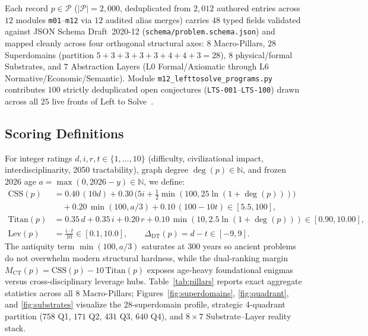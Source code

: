 \documentclass[11pt,reqno]{amsart}
\theoremstyle{plain}
\theoremstyle{definition}
\newcommand{\code}[1]{{\footnotesize\nolinkurl{#1}}}
\begin{document}
Each record $p \in \mathcal{P}$ ($|\mathcal{P}| = 2{,}000$, deduplicated from $2{,}012$ authored entries across $12$ modules \code{m01}--\code{m12} via $12$ audited alias merges) carries $48$ typed fields validated against JSON Schema Draft~2020-12 (\code{schema/problem.schema.json}) and mapped cleanly across four orthogonal structural axes: $8$ Macro-Pillars, $28$ Superdomains (partition $5+3+3+3+3+4+4+3=28$), $8$ physical/formal Substrates, and $7$ Abstraction Layers ($\text{L0}$ Formal/Axiomatic through $\text{L6}$ Normative/Economic/Semantic). Module \code{m12_lefttosolve_programs.py} contributes $100$ strictly deduplicated open conjectures (\code{LTS-001}--\code{LTS-100}) drawn across all $25$ live fronts of Left to Solve~\cite{lefttosolve2026}.

\subsection{Scoring Definitions}
For integer ratings $d, i, r, t \in \{1,\dots,10\}$ (difficulty, civilizational impact, interdisciplinarity, 2050 tractability), graph degree $\deg(p) \in \mathbb{N}$, and frozen 2026 age $a = \max(0, 2026 - y) \in \mathbb{N}$, we define:
\begin{align}
  \mathrm{CSS}(p) &= 0.40\,(10d) + 0.30\,\bigl(5i + \tfrac{1}{2}\min(100, 25\ln(1+\deg(p)))\bigr) \nonumber \\
                  &\quad + 0.20\,\min(100, a/3) + 0.10\,(100 - 10t) \in [5.5, 100], \label{eq:css}\\
  \mathrm{Titan}(p) &= 0.35\,d + 0.35\,i + 0.20\,r + 0.10\,\min(10, 2.5\ln(1+\deg(p))) \in [0.90, 10.00], \label{eq:titan}\\
  \mathrm{Lev}(p) &= \frac{i \cdot t}{10} \in [0.1, 10.0], \qquad
  \Delta_{\mathrm{DT}}(p) = d - t \in [-9, 9]. \label{eq:lev}
\end{align}
The antiquity term $\min(100, a/3)$ saturates at $300$ years so ancient problems do not overwhelm modern structural hardness, while the dual-ranking margin $M_{\mathrm{CT}}(p) = \mathrm{CSS}(p) - 10\,\mathrm{Titan}(p)$ exposes age-heavy foundational enigmas versus cross-disciplinary leverage hubs. Table~\ref{tab:pillars} reports exact aggregate statistics across all $8$ Macro-Pillars; Figures~\ref{fig:superdomains}, \ref{fig:quadrant}, and \ref{fig:substrates} visualize the 28-superdomain profile, strategic 4-quadrant partition ($758$ Q1, $171$ Q2, $431$ Q3, $640$ Q4), and $8 \times 7$ Substrate--Layer reality stack.
\end{document}
